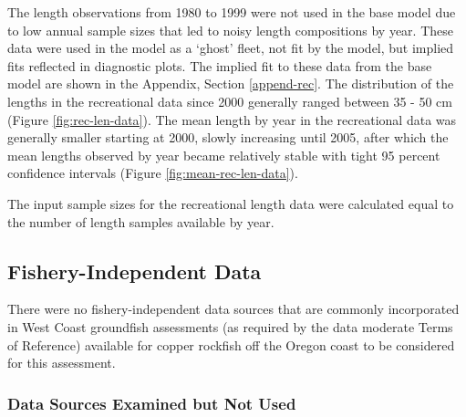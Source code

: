 \documentclass[11pt,
  english,
  a4paper,
]{article}
\begin{document}
The length observations from 1980 to 1999 were not used in the base model due to low annual sample sizes that led to noisy length compositions by year. These data were used in the model as a `ghost' fleet, not fit by the model, but implied fits reflected in diagnostic plots. The implied fit to these data from the base model are shown in the Appendix, Section \ref{append-rec}. The distribution of the lengths in the recreational data since 2000 generally ranged between 35 - 50 cm (Figure \ref{fig:rec-len-data}). The mean length by year in the recreational data was generally smaller starting at 2000, slowly increasing until 2005, after which the mean lengths observed by year became relatively stable with tight 95 percent confidence intervals (Figure \ref{fig:mean-rec-len-data}).

\leavevmode\tagmcend\tagstructend\par


The input sample sizes for the recreational length data were calculated equal to the number of length samples available by year.

\leavevmode\tagmcend\tagstructend\par


\hypertarget{fishery-independent-data}{%
\subsection{Fishery-Independent Data}\label{fishery-independent-data}}

\leavevmode\tagmcend\tagstructend


There were no fishery-independent data sources that are commonly incorporated in West Coast groundfish assessments (as required by the data moderate Terms of Reference) available for copper rockfish off the Oregon coast to be considered for this assessment.

\leavevmode\tagmcend\tagstructend\par


\hypertarget{data-sources-examined-but-not-used}{%
\subsubsection{Data Sources Examined but Not Used}\label{data-sources-examined-but-not-used}}
\end{document}

